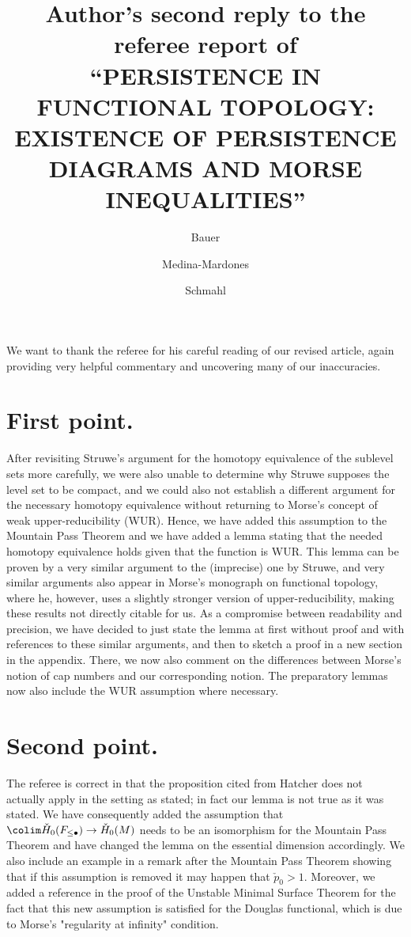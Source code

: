 \documentclass{article}
\title{Author's second reply to the referee report of \\ \textsc{
    ``PERSISTENCE IN FUNCTIONAL TOPOLOGY: EXISTENCE OF PERSISTENCE DIAGRAMS AND MORSE INEQUALITIES''
    }
}
\author{Bauer \and Medina-Mardones \and Schmahl}
\begin{document}
	\maketitle
	We want to thank the referee for his careful reading of our revised article, again providing very helpful commentary and uncovering many of our inaccuracies.
	
	\section{First point.}
	After revisiting Struwe's argument for the homotopy equivalence of the sublevel sets more carefully, we were also unable to determine why Struwe supposes the level set to be compact, and we could also not establish a different argument for the necessary homotopy equivalence without returning to Morse's concept of weak upper-reducibility (WUR). 
	Hence, we have added this assumption to the Mountain Pass Theorem and we have added a lemma stating that the needed homotopy equivalence holds given that the function is WUR.
	This lemma can be proven by a very similar argument to the (imprecise) one by Struwe, and very similar arguments also appear in Morse's monograph on functional topology, where he, however, uses a slightly stronger version of upper-reducibility, making these results not directly citable for us.
	As a compromise between readability and precision, we have decided to just state the lemma at first without proof and with references to these similar arguments, and then to sketch a proof in a new section in the appendix.
	There, we now also comment on the differences between Morse's notion of cap numbers and our corresponding notion.
	The preparatory lemmas now also include the WUR assumption where necessary.

	\section{Second point.}
	The referee is correct in that the proposition cited from Hatcher does not actually apply in the setting as stated; in fact our lemma is not true as it was stated.
	We have consequently added the assumption that $\colim \check{H}_0(F_{\leq \bullet}) \to \check{H}_0(M)$ needs to be an isomorphism for the Mountain Pass Theorem and have changed the lemma on the essential dimension accordingly.
	We also include an example in a remark after the Mountain Pass Theorem showing that if this assumption is removed it may happen that $\check{p}_0 > 1$.
	Moreover, we added a reference in the proof of the Unstable Minimal Surface Theorem for the fact that this new assumption is satisfied for the Douglas functional, which is due to Morse's "regularity at infinity" condition.
\end{document}
